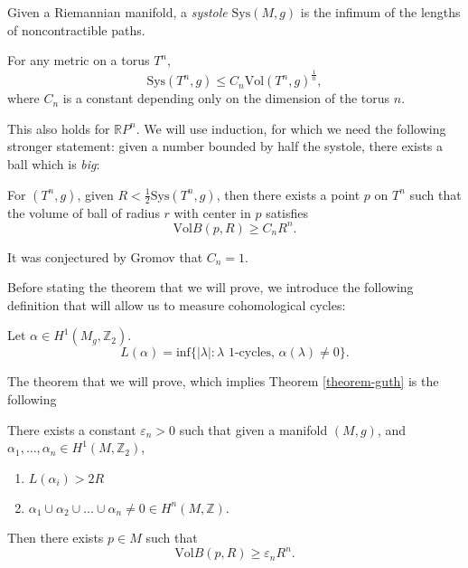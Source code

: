 \begin{definition}
\label{definition-systole}
Given a Riemannian manifold,
a {\it systole} $\text{Sys}(M,g)$ is the infimum of the lengths
of noncontractible paths.
\end{definition}

\begin{theorem}[Gromov]
\label{theorem-gromov}
For any metric on a torus $T^n$,
$$
\text{Sys}(T^n,g) \leq C_n \text{Vol}(T^n,g)^{\frac{1}{n}},
$$
where $C_n$ is a constant depending only on the dimension 
of the torus $n$.
\end{theorem}

\noindent
This also holds for $\mathbb{R}P^n$. We will use induction, 
for which we need the following stronger statement:
given a number bounded by half the systole, there exists a ball
which is {\it big}:

\begin{theorem}[Guth]
\label{theorem-guth}
For $(T^n,g)$, given $R<\frac{1}{2}\text{Sys}(T^n,g)$,
then there exists a point $p$ on $T^n$
such that the volume of ball of radius $r$ with center in $p$ 
satisfies
$$
\text{Vol}B(p,R) \geq C_nR^n.
$$
\end{theorem}

\noindent
It was conjectured by Gromov that $C_n=1$.

\medskip\noindent
Before stating the theorem that we will prove, we introduce the 
following definition that will allow us to measure cohomological cycles:

\begin{definition}
\label{definition-measuring-cohomological-cycles}
Let $\alpha \in H^{1}(M_g,\mathbb{Z}_2)$.
$$
L(\alpha)
=\text{inf}\{|\lambda|:\lambda\text{ 1-cycles, }\alpha(\lambda)\neq 0\}.
$$
\end{definition}

\noindent
The theorem that we will prove, which implies Theorem \ref{theorem-guth}
is the following

\begin{theorem}
\label{theorem-bound-classes}
There exists a constant $\varepsilon_n>0$ 
such that given a manifold $(M,g)$, and 
$\alpha_1,\ldots,\alpha_n \in H^1(M,\mathbb{Z}_2)$,
\begin{enumerate}
\item $L(\alpha_i)>2R$ 
\label{item-positive}
\item
\label{item-cup} $\alpha_1 \cup  \alpha_2 \cup \ldots \cup \alpha_n \neq 0 \in
H^n(M,\mathbb{Z})$.
\end{enumerate}

\noindent
Then there exists $p \in M$ such that
$$
\text{Vol}B(p,R) \geq \varepsilon_nR^n.
$$
\end{theorem}

